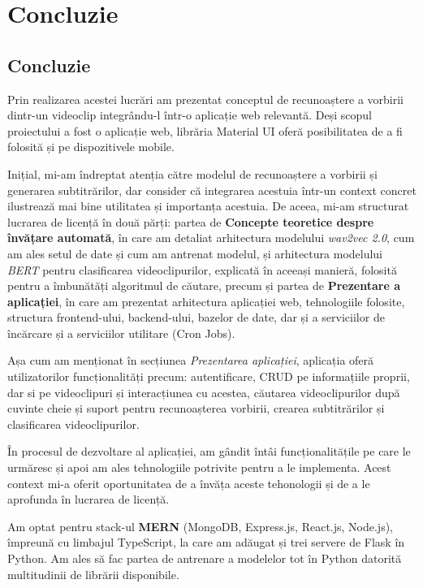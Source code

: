 \chapter{Concluzie}

\section{Concluzie}
Prin realizarea acestei lucrări am prezentat conceptul de recunoaștere a vorbirii dintr-un videoclip 
integrându-l într-o aplicație web relevantă. Deși scopul proiectului a fost o aplicație web,
librăria Material UI oferă posibilitatea de a fi folosită și pe dispozitivele mobile.
\par
Inițial, mi-am îndreptat atenția către modelul de recunoaștere a vorbirii și generarea subtitrărilor,
dar consider că  integrarea acestuia într-un context concret ilustrează mai bine utilitatea și
importanța acestuia. De aceea, mi-am structurat lucrarea de licență în două părți: partea de
\textbf{Concepte teoretice despre învățare automată}, în care am detaliat arhitectura modelului \textit{wav2vec 2.0},
cum am ales setul de date și cum am antrenat modelul, și arhitectura modelului \textit{BERT}
pentru clasificarea videoclipurilor, explicată în aceeași manieră, folosită pentru a îmbunătăți
algoritmul de căutare, precum și partea de \textbf{Prezentare a aplicației}, în care am prezentat arhitectura
aplicației web, tehnologiile folosite, structura frontend-ului, backend-ului, bazelor de date,
dar și a serviciilor de încărcare și a serviciilor utilitare (Cron Jobs).
\par
Așa cum am menționat în secțiunea \textit{Prezentarea aplicației}, aplicația oferă utilizatorilor
funcționalități precum: autentificare, CRUD pe informațiile proprii, dar si pe videoclipuri și
interacțiunea cu acestea, căutarea videoclipurilor după cuvinte cheie și suport pentru recunoașterea
vorbirii, crearea subtitrărilor și clasificarea videoclipurilor.
\par
În procesul de dezvoltare al aplicației, am gândit întâi funcționalitățile pe care le urmăresc
și apoi am ales tehnologiile potrivite pentru a le implementa. Acest context mi-a oferit 
oportunitatea de a învăța aceste tehonologii și de a le aprofunda în lucrarea de licență.
\par
Am optat pentru stack-ul \textbf{MERN} (MongoDB, Express.js, React.js, Node.js), împreună cu 
limbajul TypeScript, la care am adăugat și trei servere de Flask în Python. Am ales să fac partea
de antrenare a modelelor tot în Python datorită multitudinii de librării disponibile.
